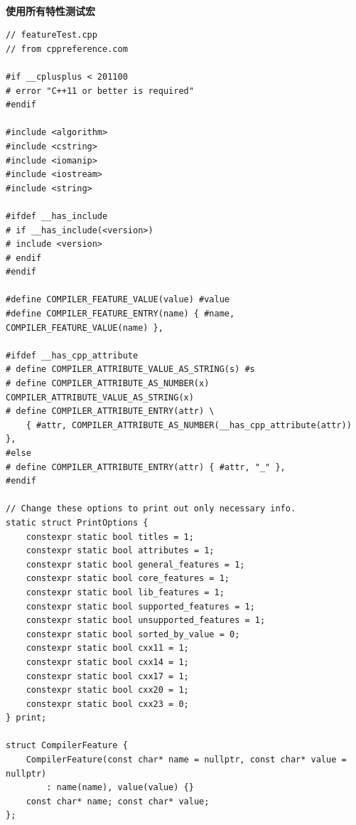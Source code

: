 \hspace*{\fill} \\ %
\noindent
\textbf{使用所有特性测试宏}
\begin{lstlisting}[style=styleCXX]
// featureTest.cpp
// from cppreference.com

#if __cplusplus < 201100
# error "C++11 or better is required"
#endif

#include <algorithm>
#include <cstring>
#include <iomanip>
#include <iostream>
#include <string>

#ifdef __has_include
# if __has_include(<version>)
# include <version>
# endif
#endif

#define COMPILER_FEATURE_VALUE(value) #value
#define COMPILER_FEATURE_ENTRY(name) { #name, COMPILER_FEATURE_VALUE(name) },

#ifdef __has_cpp_attribute
# define COMPILER_ATTRIBUTE_VALUE_AS_STRING(s) #s
# define COMPILER_ATTRIBUTE_AS_NUMBER(x) COMPILER_ATTRIBUTE_VALUE_AS_STRING(x)
# define COMPILER_ATTRIBUTE_ENTRY(attr) \
	{ #attr, COMPILER_ATTRIBUTE_AS_NUMBER(__has_cpp_attribute(attr)) },
#else
# define COMPILER_ATTRIBUTE_ENTRY(attr) { #attr, "_" },
#endif

// Change these options to print out only necessary info.
static struct PrintOptions {
	constexpr static bool titles = 1;
	constexpr static bool attributes = 1;
	constexpr static bool general_features = 1;
	constexpr static bool core_features = 1;
	constexpr static bool lib_features = 1;
	constexpr static bool supported_features = 1;
	constexpr static bool unsupported_features = 1;
	constexpr static bool sorted_by_value = 0;
	constexpr static bool cxx11 = 1;
	constexpr static bool cxx14 = 1;
	constexpr static bool cxx17 = 1;
	constexpr static bool cxx20 = 1;
	constexpr static bool cxx23 = 0;
} print;

struct CompilerFeature {
	CompilerFeature(const char* name = nullptr, const char* value = nullptr)
		: name(name), value(value) {}
	const char* name; const char* value;
};


\end{lstlisting}
